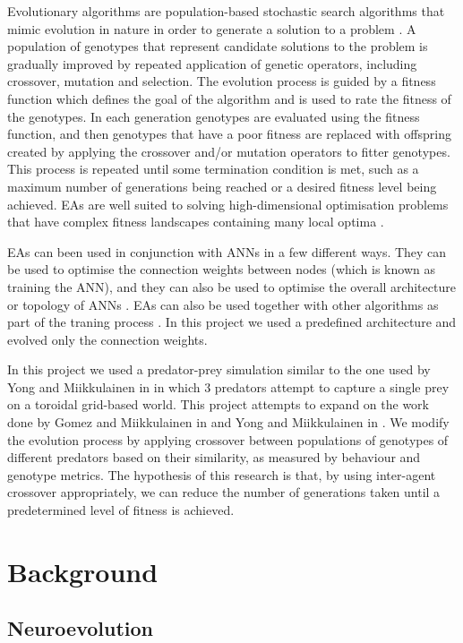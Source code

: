 \documentclass[12pt]{article} %
\begin{document}
Evolutionary algorithms are population-based stochastic search algorithms that mimic evolution in nature in order to generate a solution to a problem \cite{Floreano2008}\cite{Yao1999}. A population of genotypes that represent candidate solutions to the problem is gradually improved by repeated application of genetic operators, including crossover, mutation and selection. The evolution process is guided by a fitness function which defines the goal of the algorithm and is used to rate the fitness of the genotypes. In each generation genotypes are evaluated using the fitness function, and then genotypes that have a poor fitness are replaced with offspring created by applying the crossover and/or mutation operators to fitter genotypes. This process is repeated until some termination condition is met, such as a maximum number of generations being reached or a desired fitness level being achieved. EAs are well suited to solving high-dimensional optimisation problems that have complex fitness landscapes containing many local optima \cite{Yao1999}.

EAs can been used in conjunction with ANNs in a few different ways. They can be used to optimise the connection weights between nodes (which is known as training the ANN), and they can also be used to optimise the overall architecture or topology of ANNs \cite{Yao1999}. EAs can also be used together with other algorithms as part of the traning process \cite{Yao1999}. In this project we used a predefined architecture and evolved only the connection weights.

In this project we used a predator-prey simulation similar to the one used by Yong and Miikkulainen in \cite{Yong2001} in which 3 predators attempt to capture a single prey on a toroidal grid-based world. This project attempts to expand on the work done by Gomez and Miikkulainen in \cite{Gomez1997} and Yong and Miikkulainen in \cite{Yong2001}. We modify the evolution process by applying crossover between populations of genotypes of different predators based on their similarity, as measured by behaviour and genotype metrics. The hypothesis of this research is that, by using inter-agent crossover appropriately, we can reduce the number of generations taken until a predetermined level of fitness is achieved.

\section{Background}

\subsection{Neuroevolution}
\end{document}
